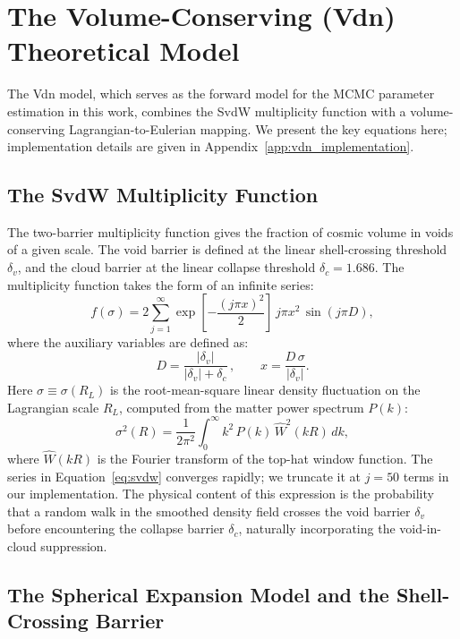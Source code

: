 \documentclass[12pt]{report}
\begin{document}
\section{The Volume-Conserving (Vdn) Theoretical Model}
\label{sec:vdn_model}

The Vdn model, which serves as the forward model for the MCMC parameter estimation in this work, combines the SvdW multiplicity function with a volume-conserving Lagrangian-to-Eulerian mapping. We present the key equations here; implementation details are given in Appendix~\ref{app:vdn_implementation}.

\subsection{The SvdW Multiplicity Function}

The \citet{Sheth2004} two-barrier multiplicity function gives the fraction of cosmic volume in voids of a given scale. The void barrier is defined at the linear shell-crossing threshold $\delta_v$, and the cloud barrier at the linear collapse threshold $\delta_c = 1.686$. The multiplicity function takes the form of an infinite series:
\begin{equation}
    f(\sigma) = 2 \sum_{j=1}^{\infty} \exp\!\left[-\frac{(j\pi x)^2}{2}\right]\, j\pi x^2 \,\sin(j\pi D)
    \label{eq:svdw},
\end{equation}
where the auxiliary variables are defined as:
\begin{equation}
    D = \frac{|\delta_v|}{|\delta_v| + \delta_c}\,, \qquad
    x = \frac{D\,\sigma}{|\delta_v|}.
\end{equation}
Here $\sigma \equiv \sigma(R_L)$ is the root-mean-square linear density fluctuation on the Lagrangian scale $R_L$, computed from the matter power spectrum $P(k)$:
\begin{equation}
    \sigma^2(R) = \frac{1}{2\pi^2}\int_0^\infty k^2\,P(k)\,\hat{W}^2(kR)\,dk
    \label{eq:sigma_R},
\end{equation}
where $\hat{W}(kR)$ is the Fourier transform of the top-hat window function. The series in Equation~\ref{eq:svdw} converges rapidly; we truncate it at $j=50$ terms in our implementation. The physical content of this expression is the probability that a random walk in the smoothed density field crosses the void barrier $\delta_v$ before encountering the collapse barrier $\delta_c$, naturally incorporating the void-in-cloud suppression.

\subsection{The Spherical Expansion Model and the Shell-Crossing Barrier}
\label{sec:spherical_expansion}
\end{document}
